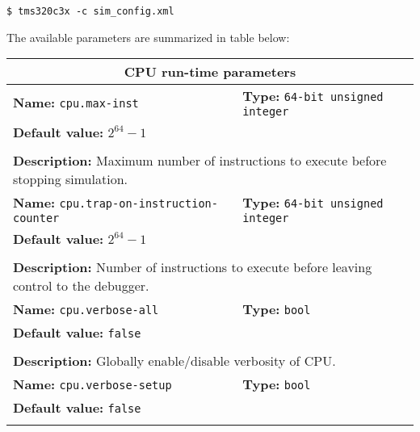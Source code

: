 \begin{verbatim}
$ tms320c3x -c sim_config.xml
\end{verbatim}

\noindent The available parameters are summarized in table below:

\begin{center}
	\begin{tabular}{|p{7.5cm}|p{7.5cm}|}
	\hline
	\multicolumn{2}{|c|}{\textbf{\large CPU run-time parameters}}\\
	\hline
	\multicolumn{1}{|p{7.5cm}}{\textbf{Name:} \texttt{cpu.max-inst}} & \multicolumn{1}{p{7.5cm}|}{\textbf{Type:} \texttt{64-bit unsigned integer}}\\
	\multicolumn{2}{|p{15cm}|}{\textbf{Default value:} \texttt{$2^{64} - 1$}}\\
	\multicolumn{2}{|l|}{}\\
	\multicolumn{2}{|p{15cm}|}{\textbf{Description:} \newline Maximum number of instructions to execute before stopping simulation.}\\
	\hline
	\multicolumn{1}{|p{7.5cm}}{\textbf{Name:} \texttt{cpu.trap-on-instruction-counter}} & \multicolumn{1}{p{7.5cm}|}{\textbf{Type:} \texttt{64-bit unsigned integer}}\\
	\multicolumn{2}{|p{15cm}|}{\textbf{Default value:} \texttt{$2^{64} - 1$}}\\
	\multicolumn{2}{|l|}{}\\
	\multicolumn{2}{|p{15cm}|}{\textbf{Description:} \newline Number of instructions to execute before leaving control to the debugger.}\\
	\hline
	\multicolumn{1}{|p{7.5cm}}{\textbf{Name:} \texttt{cpu.verbose-all}} & \multicolumn{1}{p{7.5cm}|}{\textbf{Type:} \texttt{bool}}\\
	\multicolumn{2}{|p{15cm}|}{\textbf{Default value:} \texttt{false}}\\
	\multicolumn{2}{|l|}{}\\
	\multicolumn{2}{|p{15cm}|}{\textbf{Description:} \newline Globally enable/disable verbosity of CPU.}\\
	\hline
	\multicolumn{1}{|p{7.5cm}}{\textbf{Name:} \texttt{cpu.verbose-setup}} & \multicolumn{1}{p{7.5cm}|}{\textbf{Type:} \texttt{bool}}\\
	\multicolumn{2}{|p{15cm}|}{\textbf{Default value:} \texttt{false}}\\
	\multicolumn{2}{|l|}{}\\

\end{tabular}
\end{center}
